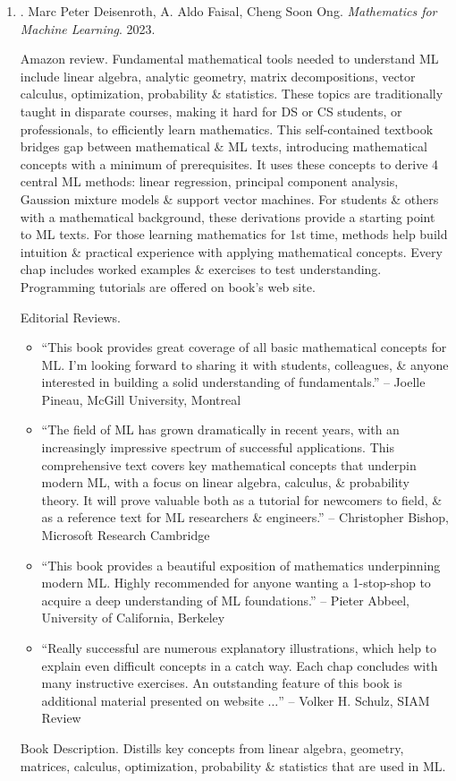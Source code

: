 \documentclass{article}
\begin{document}
\begin{enumerate}
	
	
	
	\item \cite{Deisenroth_Faisal_Ong2023}. {\sc Marc Peter Deisenroth, A. Aldo Faisal, Cheng Soon Ong}. {\it Mathematics for Machine Learning}. 2023. {}
	
	{\sf Amazon review.} Fundamental mathematical tools needed to understand ML include linear algebra, analytic geometry, matrix decompositions, vector calculus, optimization, probability \& statistics. These topics are traditionally taught in disparate courses, making it hard for DS or CS students, or professionals, to efficiently learn mathematics. This self-contained textbook bridges gap between mathematical \& ML texts, introducing mathematical concepts with a minimum of prerequisites. It uses these concepts to derive 4 central ML methods: linear regression, principal component analysis, Gaussion mixture models \& support vector machines. For students \& others with a mathematical background, these derivations provide a starting point to ML texts. For those learning mathematics for 1st time, methods help build intuition \& practical experience with applying mathematical concepts. Every chap includes worked examples \& exercises to test understanding. Programming tutorials are offered on book's web site.
	
	{\sf Editorial Reviews.}
	\begin{itemize}
		\item ``This book provides great coverage of all basic mathematical concepts for ML. I'm looking forward to sharing it with students, colleagues, \& anyone interested in building a solid understanding of fundamentals.'' -- {\sc Joelle Pineau}, McGill University, Montreal
		\item ``The field of ML has grown dramatically in recent years, with an increasingly impressive spectrum of successful applications. This comprehensive text covers key mathematical concepts that underpin modern ML, with a focus on linear algebra, calculus, \& probability theory. It will prove valuable both as a tutorial for newcomers to field, \& as a reference text for ML researchers \& engineers.'' -- {\sc Christopher Bishop}, Microsoft Research Cambridge
		\item ``This book provides a beautiful exposition of mathematics underpinning modern ML. Highly recommended for anyone wanting a 1-stop-shop to acquire a deep understanding of ML foundations.'' -- {\sc Pieter Abbeel}, University of California, Berkeley
		\item ``Really successful are numerous explanatory illustrations, which help to explain even difficult concepts in a catch way. Each chap concludes with many instructive exercises. An outstanding feature of this book is additional material presented on website $\ldots$'' -- {\sc Volker H. Schulz}, SIAM Review
	\end{itemize}
	{\sf Book Description.} Distills key concepts from linear algebra, geometry, matrices, calculus, optimization, probability \& statistics that are used in ML.
	

\end{enumerate}
\end{document}
